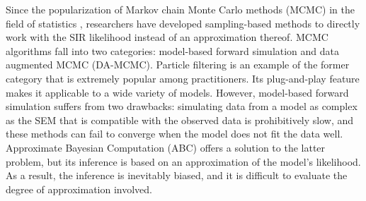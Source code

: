 \documentclass[11pt]{article}
\begin{document}
	Since the popularization of Markov chain Monte Carlo methods (MCMC) in the field of statistics \cite{Tanner.1987, Gelfand.1990, Tierney.1994}, researchers have developed sampling-based methods to directly work with the SIR likelihood instead of an approximation thereof. MCMC algorithms fall into two categories: model-based forward simulation and data augmented MCMC (DA-MCMC).
	Particle filtering \cite{King.2015} is an example of the former category that is extremely popular among practitioners. Its plug-and-play feature makes it applicable to a wide variety of models. However, model-based forward simulation suffers from two drawbacks: simulating data from a model as complex as the SEM that is compatible with the observed data is prohibitively slow, and these methods can fail to converge when the model does not fit the data well. Approximate Bayesian Computation (ABC) \cite{McKinley.2018} offers a solution to the latter problem, but its inference is based on an approximation of the model's likelihood. As a result, the inference is inevitably biased, and it is difficult to evaluate the degree of approximation involved. %
	
\end{document}
